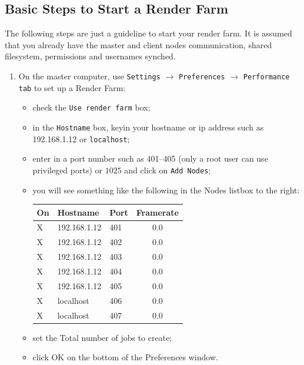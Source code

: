 \subsection{Basic Steps to Start a Render Farm}%
\label{sub:basic_steps_start_render_farm}

The following steps are just a guideline to start your render farm.  It is assumed that you already have the master and client nodes communication, shared filesystem, permissions and usernames synched.

\begin{enumerate}
    \item On the master computer, use \texttt{Settings} $\rightarrow$ \texttt{Preferences} $\rightarrow$ \texttt{Performance} \texttt{tab} to set up a Render Farm:
    \begin{itemize}
        \item check the \texttt{Use render farm} box;
        \item in the \texttt{Hostname} box, keyin your hostname or ip address such as \\
            192.168.1.12 or \texttt{localhost};
        \item enter in a port number such as 401--405 (only a root user can use privileged ports) or $1025$  and click on \texttt{Add Nodes};
        \item you will see something like the following in the Nodes listbox to the right:
            \begin{tabular}{lllc}
                On & Hostname     & Port & Framerate \\\midrule
                X  & 192.168.1.12 & 401  & 0.0       \\
                X  & 192.168.1.12 & 402  & 0.0       \\
                X  & 192.168.1.12 & 403  & 0.0       \\
                X  & 192.168.1.12 & 404  & 0.0       \\
                X  & 192.168.1.12 & 405  & 0.0       \\
                X  & localhost    & 406  & 0.0       \\
                X  & localhost    & 407  & 0.0       \\
            \end{tabular}
        \item set the Total number of jobs to create;
        \item click OK on the bottom of the Preferences window.
    \end{itemize}

\end{enumerate}

